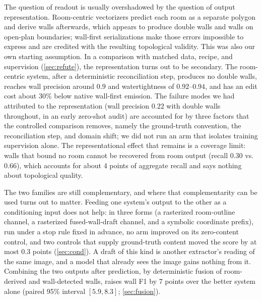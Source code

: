 \documentclass{article}
\begin{document}
The question of readout is usually overshadowed by the question of output
representation. Room-centric vectorizers
\citep{yue2023roomformer,liu2024polyroom,xu2024frinet,phung2026raster2seq}
predict each room as a separate polygon and derive walls afterwards, which
appears to produce double walls and walls on open-plan boundaries; wall-first
serializations \citep{floorplanvlm2026,cage2025} make those errors impossible
to express and are credited with the resulting topological validity. This was
also our own starting assumption. In a comparison with matched data, recipe,
and supervision (\cref{sec:refute}), the representation turns out to be
secondary. The room-centric system, after a deterministic reconciliation step,
produces no double walls, reaches wall precision around $0.9$ and
watertightness of $0.92$--$0.94$, and has an edit cost about 30\% below native wall-first emission.
The failure modes we had attributed to the representation (wall precision
$0.22$ with double walls throughout, in an early zero-shot audit) are accounted
for by three factors that the controlled comparison removes, namely the
ground-truth convention, the reconciliation step, and domain shift; we did not
run an arm that isolates training supervision alone. The representational
effect that remains is a coverage limit: walls that bound no room cannot be recovered from
room output (recall $0.30$ vs.\ $0.66$), which accounts for about 4 points of
aggregate recall and says nothing about topological quality.

The two families are still complementary, and where that
complementarity can be used turns out to matter. Feeding one system's output
to the other as a conditioning input does not help: in three forms (a
rasterized room-outline channel, a rasterized fused-wall-draft channel, and a
symbolic coordinate prefix), run under a stop rule fixed in advance, no arm
improved on its zero-content control, and two controls that supply
ground-truth content moved the score by at most 0.3 points
(\cref{sec:cond}). A draft of this kind is another extractor's reading of the
same image, and a model that already sees the image gains nothing from it.
Combining the two outputs after prediction, by deterministic fusion of
room-derived and wall-detected walls, raises wall F1 by $7$ points over the
better system alone (paired 95\% interval $[5.9,8.3]$; \cref{sec:fusion}).
\end{document}
